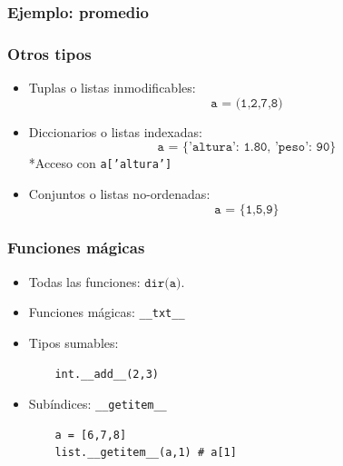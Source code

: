 \documentclass[14pt,aspectratio=169,xcolor=dvipsnames]{beamer}
\begin{document}
\begin{frame}\frametitle{Ejemplo: promedio}
\end{frame}
\begin{frame}\frametitle{Otros tipos}
    \begin{itemize}
        \item Tuplas o listas inmodificables: 
            $$  \texttt{a = (1,2,7,8)} $$
        \item Diccionarios o listas indexadas:
            $$ \texttt{a = \{'altura': 1.80, 'peso': 90\}} $$
            *Acceso con \texttt{a['altura']}
        \item Conjuntos o listas no-ordenadas: 
            $$ \texttt{a = \{1,5,9\}} $$
    \end{itemize}

\pause{}
\end{frame}
\begin{frame}[fragile]\frametitle{Funciones mágicas}

\begin{itemize}
    \item Todas las funciones: $\texttt{dir(a)}$.
    \item Funciones mágicas: \verb+__txt__+
    \item Tipos sumables: %
        \begin{verbatim}
    int.__add__(2,3)
        \end{verbatim}
    \item Subíndices: \verb+__getitem__+
        \begin{verbatim}
    a = [6,7,8]
    list.__getitem__(a,1) # a[1]
        \end{verbatim}
\end{itemize}

\vspace{2cm}
\end{frame}
\begin{frame}
    \maketitle
\end{frame}
\end{document}
